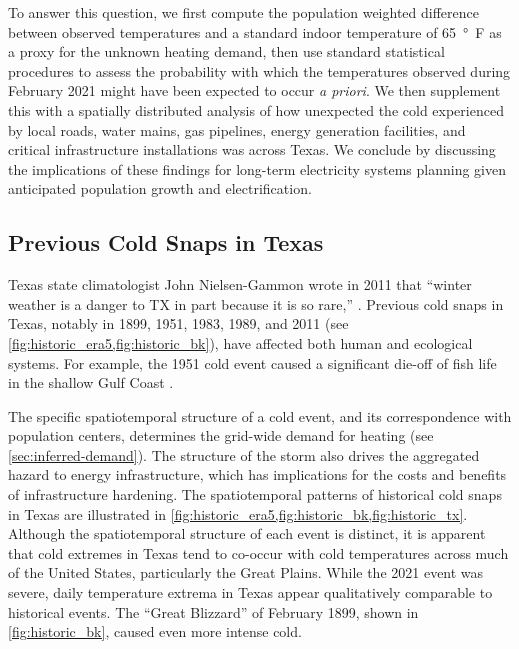 \documentclass[12pt]{iopart}
\begin{document}
To answer this question, we first compute the population weighted difference between observed temperatures and a standard indoor temperature of \SI{65}{\degree F} as a proxy for the unknown heating demand, then use standard statistical procedures to assess the probability with which the temperatures observed during February 2021 might have been expected to occur \emph{a priori}.
We then supplement this with a spatially distributed analysis of how unexpected the cold experienced by local roads, water mains, gas pipelines, energy generation facilities, and critical infrastructure installations was across Texas.
We conclude by discussing the implications of these findings for long-term electricity systems planning given anticipated population growth and electrification.

\subsection{Previous Cold Snaps in Texas}


Texas state climatologist John Nielsen-Gammon wrote in 2011 that ``winter weather is a danger to TX in part because it is so rare,'' \cite{nielsen-gammon_txacc:2011}.
Previous cold snaps in Texas, notably in 1899, 1951, 1983, 1989, and 2011 (see \cref{fig:historic_era5,fig:historic_bk}), have affected both human and ecological systems.
For example, the 1951 cold event caused a  significant die-off of fish life in the shallow Gulf Coast \cite{gunter_fishes:1951}.

The specific spatiotemporal structure of a cold event, and its correspondence with population centers, determines the grid-wide demand for heating (see \cref{sec:inferred-demand}).
The structure of the storm also drives the aggregated hazard to energy infrastructure, which has implications for the costs and benefits of infrastructure hardening.
The spatiotemporal patterns of historical cold snaps in Texas are illustrated in \cref{fig:historic_era5,fig:historic_bk,fig:historic_tx}.
Although the spatiotemporal structure of each event is distinct, it is apparent that cold extremes in Texas tend to co-occur with cold temperatures across much of the United States, particularly the Great Plains.
While the 2021 event was severe, daily temperature extrema in Texas appear qualitatively comparable to historical events.
The ``Great Blizzard'' of February 1899, shown in \cref{fig:historic_bk}, caused even more intense cold.
\end{document}
